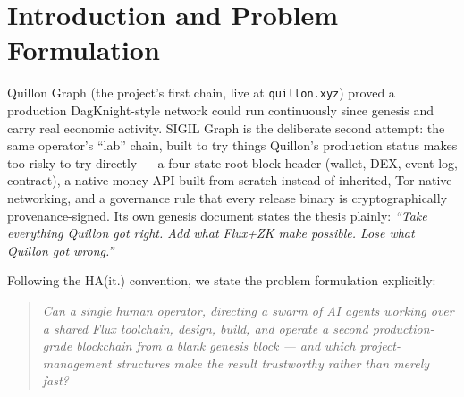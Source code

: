 
\begin{abstract}
\noindent This report analyses SIGIL Graph --- a DagKnight-consensus sister chain built on the Flux platform --- as a \emph{project}, using the project-management toolbox of the Copenhagen Business School HA(it.) tradition: problem formulation, stakeholder analysis, phase/Gantt planning, milestone tracking, risk management, execution analytics, and a business-case discussion. All quantitative material is mined from primary sources: the git history (722 commits, 2026-06-05 to 2026-08-26, across 88 crates and 139{,}000+ lines of Rust), 111 release tags, and the live chain itself (queried at report time: v5.1.1, height climbing, 19.04\,\% of the 21{,}000{,}000 SIGIL cap minted). The project's headline result: a second, independent, DagKnight-braid blockchain --- with its own money API, DEX, wallet, and network-map UI --- taken from zero to a self-sustaining testnet in twelve weeks by a human operator directing a swarm of AI agents, with every claim gated by a measurement, not a status update.
\end{abstract}

\tableofcontents
\vspace{1em}

\section{Introduction and Problem Formulation}

Quillon Graph (the project's first chain, live at \texttt{quillon.xyz}) proved a production DagKnight-style network could run continuously since genesis and carry real economic activity. SIGIL Graph is the deliberate second attempt: the same operator's ``lab'' chain, built to try things Quillon's production status makes too risky to try directly --- a four-state-root block header (wallet, DEX, event log, contract), a native money API built from scratch instead of inherited, Tor-native networking, and a governance rule that every release binary is cryptographically provenance-signed. Its own genesis document states the thesis plainly: \emph{``Take everything Quillon got right. Add what Flux+ZK make possible. Lose what Quillon got wrong.''}

Following the HA(it.) convention, we state the problem formulation explicitly:

\begin{quote}
\emph{Can a single human operator, directing a swarm of AI agents working over a shared Flux toolchain, design, build, and operate a second production-grade blockchain from a blank genesis block --- and which project-management structures make the result trustworthy rather than merely fast?}
\end{quote}

